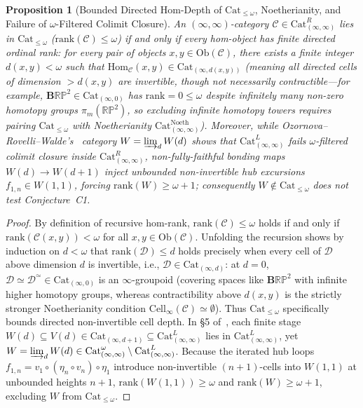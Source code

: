 \documentclass[10pt,twoside,openright]{book}
\theoremstyle{crmplain}
\newtheorem{proposition}[theorem]{Proposition}
\theoremstyle{crmdef}
\theoremstyle{crmremark}
\begin{document}
\begin{proposition}[Bounded Directed Hom-Depth of $\mathrm{Cat}_{\le \omega}$, Noetherianity, and Failure of $\omega$-Filtered Colimit Closure]\label{prop:cat-le-omega-lfd}
An $(\infty, \infty)$-category $\mathcal{C} \in \mathrm{Cat}^R_{(\infty, \infty)}$ lies in $\mathrm{Cat}_{\le \omega}$ ($\mathrm{rank}(\mathcal{C}) \le \omega$) if and only if every hom-object has finite directed ordinal rank: for every pair of objects $x, y \in \mathrm{Ob}(\mathcal{C})$, there exists a finite integer $d(x, y) < \omega$ such that $\mathrm{Hom}_{\mathcal{C}}(x, y) \in \mathrm{Cat}_{(\infty, d(x, y))}$ (meaning all directed cells of dimension $> d(x, y)$ are \emph{invertible}, though not necessarily contractible---for example, $\mathbf{B}\mathbb{R}\mathbb{P}^2 \in \mathrm{Cat}_{(\infty, 0)}$ has $\mathrm{rank} = 0 \le \omega$ despite infinitely many non-zero homotopy groups $\pi_m(\mathbb{R}\mathbb{P}^2)$, so excluding infinite homotopy towers requires pairing $\mathrm{Cat}_{\le \omega}$ with Noetherianity $\mathrm{Cat}^{\mathrm{Noeth}}_{(\infty,\infty)}$). Moreover, while Ozornova--Rovelli--Walde's~\cite[\S 5]{ORW26} category $W = \varinjlim_d W(d)$ shows that $\mathrm{Cat}^L_{(\infty, \infty)}$ fails $\omega$-filtered colimit closure inside $\mathrm{Cat}^R_{(\infty, \infty)}$, non-fully-faithful bonding maps $W(d) \to W(d+1)$ inject unbounded non-invertible hub excursions $f_{1, n} \in W(1, 1)$, forcing $\mathrm{rank}(W) \ge \omega + 1$; consequently $W \notin \mathrm{Cat}_{\le \omega}$ does not test Conjecture~C1.
\end{proposition}

\begin{proof}
By definition of recursive hom-rank, $\mathrm{rank}(\mathcal{C}) \le \omega$ holds if and only if $\mathrm{rank}(\mathcal{C}(x, y)) < \omega$ for all $x, y \in \mathrm{Ob}(\mathcal{C})$. Unfolding the recursion shows by induction on $d < \omega$ that $\mathrm{rank}(\mathcal{D}) \le d$ holds precisely when every cell of $\mathcal{D}$ above dimension $d$ is invertible, i.e., $\mathcal{D} \in \mathrm{Cat}_{(\infty, d)}$: at $d = 0$, $\mathcal{D} \simeq \mathcal{D}^{\simeq} \in \mathrm{Cat}_{(\infty, 0)}$ is an $\infty$-groupoid (covering spaces like $\mathbf{B}\mathbb{R}\mathbb{P}^2$ with infinite higher homotopy groups, whereas contractibility above $d(x, y)$ is the strictly stronger Noetherianity condition $\mathrm{Cell}_\infty(\mathcal{C}) \simeq \emptyset$). Thus $\mathrm{Cat}_{\le \omega}$ specifically bounds directed non-invertible cell depth. In \S 5 of~\cite{ORW26}, each finite stage $W(d) \subseteq V(d) \in \mathrm{Cat}_{(\infty, d+1)} \subseteq \mathrm{Cat}^L_{(\infty, \infty)}$ lies in $\mathrm{Cat}^L_{(\infty, \infty)}$, yet $W = \varinjlim_d W(d) \in \mathrm{Cat}^\omega_{(\infty, \infty)} \setminus \mathrm{Cat}^L_{(\infty, \infty)}$. Because the iterated hub loops $f_{1, n} = v_1 \circ (\eta_n \circ v_n) \circ \eta_1$ introduce non-invertible $(n+1)$-cells into $W(1, 1)$ at unbounded heights $n + 1$, $\mathrm{rank}(W(1, 1)) \ge \omega$ and $\mathrm{rank}(W) \ge \omega + 1$, excluding $W$ from $\mathrm{Cat}_{\le \omega}$.
\end{proof}
\end{document}

